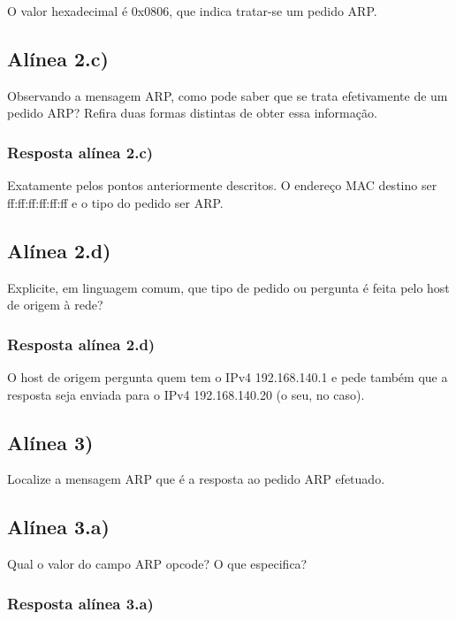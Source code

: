 \documentclass{article}
\begin{document}
O valor hexadecimal é 0x0806, que indica tratar-se um pedido ARP.

\pagebreak


\subsection{Alínea 2.c)}

Observando a mensagem ARP, como pode saber que se trata efetivamente de um pedido ARP? Refira duas
formas distintas de obter essa informação.

\subsubsection{Resposta alínea 2.c)}

Exatamente pelos pontos anteriormente descritos. O endereço MAC destino ser ff:ff:ff:ff:ff:ff e o tipo do pedido ser ARP.


\subsection{Alínea 2.d)}

Explicite, em linguagem comum, que tipo de pedido ou pergunta é feita pelo host de origem à rede?

\subsubsection{Resposta alínea 2.d)}

O host de origem pergunta quem tem o IPv4 192.168.140.1 e pede também que a resposta seja enviada para o IPv4 192.168.140.20 (o seu, no caso).

\subsection{Alínea 3)}

Localize a mensagem ARP que é a resposta ao pedido ARP efetuado.

\subsection{Alínea 3.a)}

Qual o valor do campo ARP opcode? O que especifica?

\subsubsection{Resposta alínea 3.a)}
\end{document}
